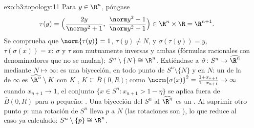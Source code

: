 \begin{solution}{exo:b3:topology:11}
Para $y \in \R^n$, póngase
\[
\tau(y) = \Bigl(\frac{2y}{\norm y^2 + 1},\ \frac{\norm y^2 -
1}{\norm y^2 + 1}\Bigr) \in \R^n\times\R = \R^{n+1}.
\]
Se comprueba que $\norm{\tau(y)} = 1$, $\tau(y) \neq N$, y
$\sigma(\tau(y)) = y$, $\tau(\sigma(x)) = x$: $\sigma$ y $\tau$ son
mutuamente inversas y ambas
 (fórmulas racionales con
denominadores que no se anulan): $S^n\setminus\{N\} \cong
\R^n$. Extiéndase a $\hat\sigma \colon S^n \to \widehat{\R^n}$ mediante
$N \mapsto \infty$: es una biyección,
 en todo punto de
$S^n\setminus\{N\}$ y en $N$: un
 de la
 de $\infty$ es
$\widehat{\R^n}\setminus K$ con $K$
, $K
\subseteq \bar B(0, R)$; como $\norm{\sigma(x)}^2 = \frac{1 +
x_{n+1}}{1 - x_{n+1}} \to \infty$ cuando $x_{n+1} \to 1$, el conjunto
$\{x \in S^n : x_{n+1} > 1 - \eta\}$ se aplica fuera de $\bar B(0,R)$
para $\eta$ pequeño: .
Una biyección  del
 $S^n$ al
 $\widehat{\R^n}$ es un
. Al suprimir otro
punto $p$: una rotación de $S^n$ lleva $p$ a $N$ (las rotaciones son
), lo que reduce al
caso ya calculado: $S^n \setminus \{p\} \cong \R^n$.
\end{solution}

